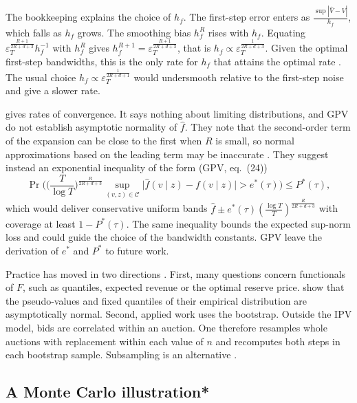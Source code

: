 The bookkeeping explains the choice of $h_f$. The first-step error enters as $\frac{\sup|\hat V-V|}{h_f}$, which falls as $h_f$ grows. The smoothing bias $h_f^R$ rises with $h_f$. Equating $\varepsilon_T^{\frac{R+1}{2R+d+3}}h_f^{-1}$ with $h_f^R$ gives $h_f^{R+1}=\varepsilon_T^{\frac{R+1}{2R+d+3}}$, that is $h_f\propto\varepsilon_T^{\frac{1}{2R+d+3}}$. Given the optimal first-step bandwidths, this is the only rate for $h_f$ that attains the optimal rate \citep[p.~546]{GuerrePerrigneVuong2000}. The usual choice $h_f\propto\varepsilon_T^{\frac{1}{2R+d+1}}$ would undersmooth relative to the first-step noise and give a slower rate.

  gives rates of convergence. It says nothing about limiting distributions, and GPV do not establish asymptotic normality of $\hat f$. They note that the second-order term of the expansion can be close to the first when $R$ is small, so normal approximations based on the leading term may be inaccurate \citep[p.~546]{GuerrePerrigneVuong2000}. They suggest instead an exponential inequality of the form (GPV, eq.~(24))
\[
\Pr\Big(\Big(\frac{T}{\log T}\Big)^{\frac{R}{2R+d+3}}\sup_{(v,z)\in\mathcal C}\big|\hat f(v\mid z)-f(v\mid z)\big|>e^*(\tau)\Big)\le P^*(\tau),
\]
which would deliver conservative uniform bands $\hat f\pm e^*(\tau)(\frac{\log T}{T})^{\frac{R}{2R+d+3}}$ with coverage at least $1-P^*(\tau)$. The same inequality bounds the expected sup-norm loss and could guide the choice of the bandwidth constants. GPV leave the derivation of $e^*$ and $P^*$ to future work.

Practice has moved in two directions \citep[Section 3.2.1]{AtheyHaile2007}. First, many questions concern functionals of $F$, such as quantiles, expected revenue or the optimal reserve price.  show that the pseudo-values and fixed quantiles of their empirical distribution are asymptotically normal. Second, applied work uses the bootstrap. Outside the IPV model, bids are correlated within an auction. One therefore resamples whole auctions with replacement within each value of $n$ and recomputes both steps in each bootstrap sample. Subsampling is an alternative \citep{HaileHongShum2003}.

\subsection{A Monte Carlo illustration*}\label{sec:15-gpv-mc}

